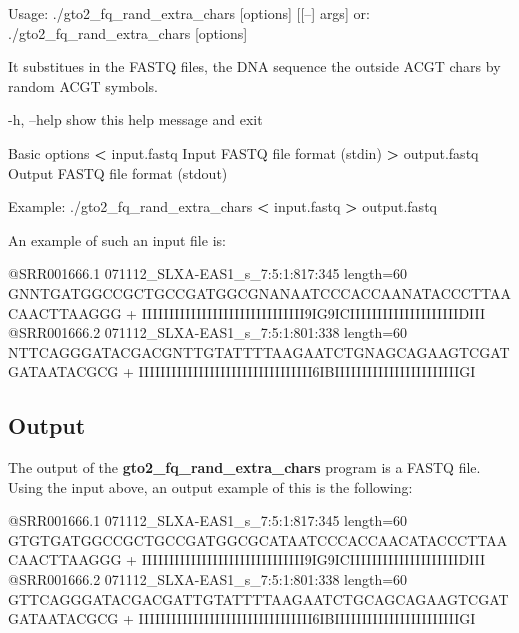 \documentclass[11pt,]{krantz}
\newenvironment{Shaded}{\begin{snugshade}}{\end{snugshade}}
\newcommand{\OperatorTok}[1]{\textcolor[rgb]{0.43,0.43,0.43}{\textbf{#1}}}
\newcommand{\ExtensionTok}[1]{#1}
\newcommand{\NormalTok}[1]{#1}
\begin{document}
\begin{Shaded}
\begin{Highlighting}[]
\ExtensionTok{Usage}\NormalTok{: ./gto2_fq_rand_extra_chars [options] [[--] args]}
   \ExtensionTok{or}\NormalTok{: ./gto2_fq_rand_extra_chars [options]}

\ExtensionTok{It}\NormalTok{ substitues in the FASTQ files, the DNA sequence the }
\ExtensionTok{outside}\NormalTok{ ACGT chars by random ACGT symbols.}

    \ExtensionTok{-h}\NormalTok{, --help            show this help message and exit}

\ExtensionTok{Basic}\NormalTok{ options}
    \OperatorTok{<} \ExtensionTok{input.fastq}\NormalTok{         Input FASTQ file format (stdin)}
    \OperatorTok{>} \ExtensionTok{output.fastq}\NormalTok{        Output FASTQ file format (stdout)}

\ExtensionTok{Example}\NormalTok{: ./gto2_fq_rand_extra_chars }\OperatorTok{<}\NormalTok{ input.fastq }\OperatorTok{>} 
\ExtensionTok{output.fastq}
\end{Highlighting}
\end{Shaded}

An example of such an input file is:

\begin{Shaded}
\begin{Highlighting}[]
\ExtensionTok{@SRR001666.1}\NormalTok{ 071112_SLXA-EAS1_s_7:5:1:817:345 length=60}
\ExtensionTok{GNNTGATGGCCGCTGCCGATGGCGNANAATCCCACCAANATACCCTTAACAACTTAAGGG}
\ExtensionTok{+}
\ExtensionTok{IIIIIIIIIIIIIIIIIIIIIIIIIIIIII9IG9ICIIIIIIIIIIIIIIIIIIIIDIII}
\ExtensionTok{@SRR001666.2}\NormalTok{ 071112_SLXA-EAS1_s_7:5:1:801:338 length=60}
\ExtensionTok{NTTCAGGGATACGACGNTTGTATTTTAAGAATCTGNAGCAGAAGTCGATGATAATACGCG}
\ExtensionTok{+}
\ExtensionTok{IIIIIIIIIIIIIIIIIIIIIIIIIIIIIIII6IBIIIIIIIIIIIIIIIIIIIIIIIGI}
\end{Highlighting}
\end{Shaded}

\subsection*{Output}\label{output-8}


The output of the \textbf{gto2\_fq\_rand\_extra\_chars} program is a
FASTQ file. Using the input above, an output example of this is the
following:

\begin{Shaded}
\begin{Highlighting}[]
\ExtensionTok{@SRR001666.1}\NormalTok{ 071112_SLXA-EAS1_s_7:5:1:817:345 length=60}
\ExtensionTok{GTGTGATGGCCGCTGCCGATGGCGCATAATCCCACCAACATACCCTTAACAACTTAAGGG}
\ExtensionTok{+}
\ExtensionTok{IIIIIIIIIIIIIIIIIIIIIIIIIIIIII9IG9ICIIIIIIIIIIIIIIIIIIIIDIII}
\ExtensionTok{@SRR001666.2}\NormalTok{ 071112_SLXA-EAS1_s_7:5:1:801:338 length=60}
\ExtensionTok{GTTCAGGGATACGACGATTGTATTTTAAGAATCTGCAGCAGAAGTCGATGATAATACGCG}
\ExtensionTok{+}
\ExtensionTok{IIIIIIIIIIIIIIIIIIIIIIIIIIIIIIII6IBIIIIIIIIIIIIIIIIIIIIIIIGI}
\end{Highlighting}
\end{Shaded}
\end{document}

